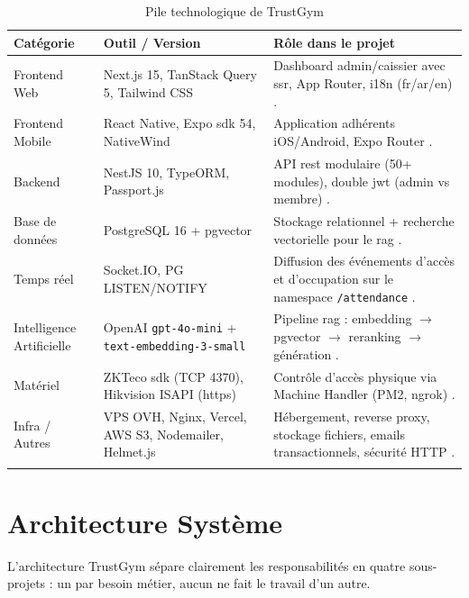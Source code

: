 \documentclass[../main.tex]{subfiles}
\begin{document}
\begin{longtable}{|p{3.5cm}|p{3cm}|p{7cm}|}
\hline
\textbf{Cat\'{e}gorie} & \textbf{Outil / Version} & \textbf{R\^{o}le dans le projet} \\
\hline
\endfirsthead
\hline
\endfoot
Frontend Web & Next.js 15, TanStack Query 5, Tailwind CSS & Dashboard admin/caissier avec \acrshort{ssr}, App Router, i18n (fr/ar/en) \cite{nextjs, tanstack, tailwind}. \\
\hline
Frontend Mobile & React Native, Expo \acrshort{sdk} 54, NativeWind & Application adh\'{e}rents iOS/Android, Expo Router \cite{reactnative, expo, nativewind}. \\
\hline
Backend & NestJS 10, TypeORM, Passport.js & API \acrshort{rest} modulaire (50+ modules), double \acrshort{jwt} (admin vs membre) \cite{nestjs, typeorm, passport}. \\
\hline
Base de donn\'{e}es & PostgreSQL 16 + pgvector & Stockage relationnel + recherche vectorielle pour le \acrshort{rag} \cite{postgre, pgvector}. \\
\hline
Temps r\'{e}el & Socket.IO, PG LISTEN/NOTIFY & Diffusion des \'{e}v\'{e}nements d'acc\`{e}s et d'occupation sur le namespace \texttt{/attendance} \cite{socketio}. \\
\hline
Intelligence Artificielle & OpenAI \texttt{gpt-4o-mini} + \texttt{text-embedding-3-small} & Pipeline \acrshort{rag} : embedding $\rightarrow$ pgvector $\rightarrow$ reranking $\rightarrow$ g\'{e}n\'{e}ration \cite{openai}. \\
\hline
Mat\'{e}riel & ZKTeco \acrshort{sdk} (TCP 4370), Hikvision ISAPI (\acrshort{https}) & Contr\^{o}le d'acc\`{e}s physique via Machine Handler (PM2, ngrok) \cite{zkteco, hikvision, pm2}. \\
\hline
Infra / Autres & VPS OVH, Nginx, Vercel, AWS S3, Nodemailer, Helmet.js & H\'{e}bergement, reverse proxy, stockage fichiers, emails transactionnels, s\'{e}curit\'{e} HTTP \cite{aws, helmet}. \\
\hline
\caption{Pile technologique de TrustGym}
\end{longtable}

\section{Architecture Syst\`{e}me}

L'architecture TrustGym s\'{e}pare clairement les responsabilit\'{e}s en quatre sous-projets : un par besoin m\'{e}tier, aucun ne fait le travail d'un autre.
\end{document}
